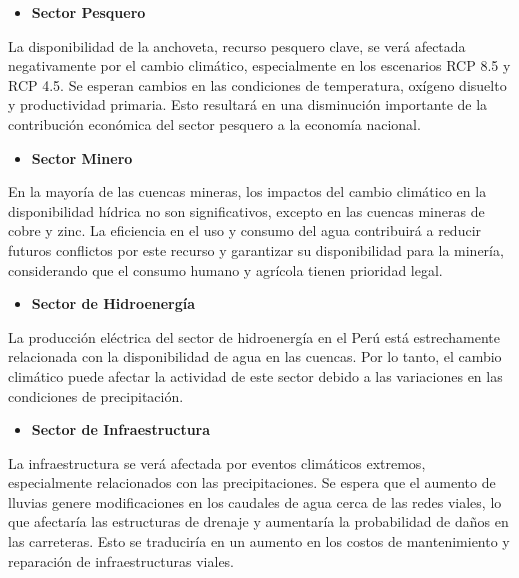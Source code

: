 \documentclass[
  stu,
  floatsintext,
  longtable,
  a4paper,
  nolmodern,
  notxfonts,
  notimes,
  12pt,
  colorlinks=true,linkcolor=blue,citecolor=blue,urlcolor=blue]{apa7}
\providecommand{\tightlist}{%
  \setlength{\itemsep}{0pt}\setlength{\parskip}{0pt}}
\begin{document}
\begin{itemize}
\tightlist
\item
  \textbf{Sector Pesquero}
\end{itemize}

La disponibilidad de la anchoveta, recurso pesquero clave, se verá
afectada negativamente por el cambio climático, especialmente en los
escenarios RCP 8.5 y RCP 4.5. Se esperan cambios en las condiciones de
temperatura, oxígeno disuelto y productividad primaria. Esto resultará
en una disminución importante de la contribución económica del sector
pesquero a la economía nacional.

\begin{itemize}
\tightlist
\item
  \textbf{Sector Minero}
\end{itemize}

En la mayoría de las cuencas mineras, los impactos del cambio climático
en la disponibilidad hídrica no son significativos, excepto en las
cuencas mineras de cobre y zinc. La eficiencia en el uso y consumo del
agua contribuirá a reducir futuros conflictos por este recurso y
garantizar su disponibilidad para la minería, considerando que el
consumo humano y agrícola tienen prioridad legal.

\begin{itemize}
\tightlist
\item
  \textbf{Sector de Hidroenergía}
\end{itemize}

La producción eléctrica del sector de hidroenergía en el Perú está
estrechamente relacionada con la disponibilidad de agua en las cuencas.
Por lo tanto, el cambio climático puede afectar la actividad de este
sector debido a las variaciones en las condiciones de precipitación.

\begin{itemize}
\tightlist
\item
  \textbf{Sector de Infraestructura}
\end{itemize}

La infraestructura se verá afectada por eventos climáticos extremos,
especialmente relacionados con las precipitaciones. Se espera que el
aumento de lluvias genere modificaciones en los caudales de agua cerca
de las redes viales, lo que afectaría las estructuras de drenaje y
aumentaría la probabilidad de daños en las carreteras. Esto se
traduciría en un aumento en los costos de mantenimiento y reparación de
infraestructuras viales.
\end{document}
